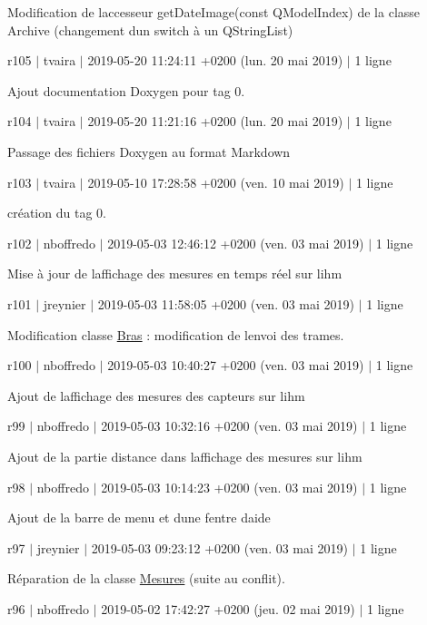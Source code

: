 Modification de l\textquotesingle{}accesseur get\+Date\+Image(const Q\+Model\+Index) de la classe Archive (changement d\textquotesingle{}un switch à un Q\+String\+List)

r105 $\vert$ tvaira $\vert$ 2019-\/05-\/20 11\+:24\+:11 +0200 (lun. 20 mai 2019) $\vert$ 1 ligne

Ajout documentation Doxygen pour tag 0.

r104 $\vert$ tvaira $\vert$ 2019-\/05-\/20 11\+:21\+:16 +0200 (lun. 20 mai 2019) $\vert$ 1 ligne

Passage des fichiers Doxygen au format Markdown

r103 $\vert$ tvaira $\vert$ 2019-\/05-\/10 17\+:28\+:58 +0200 (ven. 10 mai 2019) $\vert$ 1 ligne

création du tag 0.

r102 $\vert$ nboffredo $\vert$ 2019-\/05-\/03 12\+:46\+:12 +0200 (ven. 03 mai 2019) $\vert$ 1 ligne

Mise à jour de l\textquotesingle{}affichage des mesures en temps réel sur l\textquotesingle{}ihm

r101 $\vert$ jreynier $\vert$ 2019-\/05-\/03 11\+:58\+:05 +0200 (ven. 03 mai 2019) $\vert$ 1 ligne

Modification classe \hyperlink{class_bras}{Bras} \+: modification de l\textquotesingle{}envoi des trames.

r100 $\vert$ nboffredo $\vert$ 2019-\/05-\/03 10\+:40\+:27 +0200 (ven. 03 mai 2019) $\vert$ 1 ligne

Ajout de l\textquotesingle{}affichage des mesures des capteurs sur l\textquotesingle{}ihm

r99 $\vert$ nboffredo $\vert$ 2019-\/05-\/03 10\+:32\+:16 +0200 (ven. 03 mai 2019) $\vert$ 1 ligne

Ajout de la partie distance dans l\textquotesingle{}affichage des mesures sur l\textquotesingle{}ihm

r98 $\vert$ nboffredo $\vert$ 2019-\/05-\/03 10\+:14\+:23 +0200 (ven. 03 mai 2019) $\vert$ 1 ligne

Ajout de la barre de menu et d\textquotesingle{}une fentre d\textquotesingle{}aide

r97 $\vert$ jreynier $\vert$ 2019-\/05-\/03 09\+:23\+:12 +0200 (ven. 03 mai 2019) $\vert$ 1 ligne

Réparation de la classe \hyperlink{class_mesures}{Mesures} (suite au conflit).

r96 $\vert$ nboffredo $\vert$ 2019-\/05-\/02 17\+:42\+:27 +0200 (jeu. 02 mai 2019) $\vert$ 1 ligne


